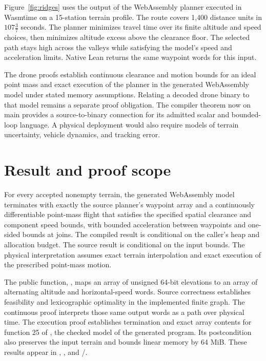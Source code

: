 \documentclass[11pt]{article}
\begin{document}
Figure~\ref{fig:ridges} uses the output of the WebAssembly planner executed in Wasmtime on a 15-station terrain profile.  The route covers 1,400 distance units in $107\tfrac{3}{7}$ seconds.  The planner minimizes travel time over its finite altitude and speed choices, then minimizes altitude excess above the clearance floor.  The selected path stays high across the valleys while satisfying the model's speed and acceleration limits.  Native Lean returns the same waypoint words for this input.

The drone proofs establish continuous clearance and motion bounds for an ideal point mass and exact execution of the planner in the generated WebAssembly model under stated memory assumptions.  Relating a decoded drone binary to that model remains a separate proof obligation.  The compiler theorem now on main provides a source-to-binary connection for its admitted scalar and bounded-loop language.  A physical deployment would also require models of terrain uncertainty, vehicle dynamics, and tracking error.

\section{Result and proof scope}

For every accepted nonempty terrain, the generated WebAssembly model terminates with exactly the source planner's waypoint array and a continuously differentiable point-mass flight that satisfies the specified spatial clearance and component speed bounds, with bounded acceleration between waypoints and one-sided bounds at joins.  The compiled result is conditional on the caller's heap and allocation budget.  The source result is conditional on the input bounds.  The physical interpretation assumes exact terrain interpolation and exact execution of the prescribed point-mass motion.

The public function, , maps an array of unsigned 64-bit elevations to an array of alternating altitude and horizontal-speed words.  Source correctness establishes feasibility and lexicographic optimality in the implemented finite graph.  The continuous proof interprets those same output words as a path over physical time.  The execution proof establishes termination and exact array contents for function 25 of , the checked model of the generated program.  Its postcondition also preserves the input terrain and bounds linear memory by 64 MiB.  These results appear in , , and /.
\end{document}
